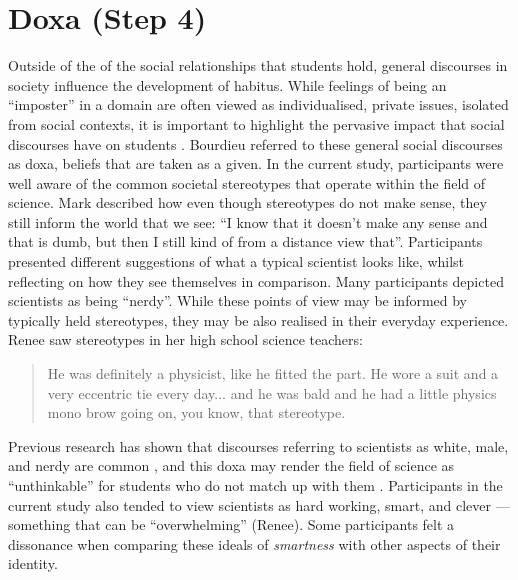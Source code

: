 \section{Doxa (Step 4)}
Outside of the of the social relationships that students hold, general discourses in society influence the development of habitus. 
While feelings of being an ``imposter'' in a domain are often viewed as individualised, private issues, isolated from social contexts, it is important to highlight the pervasive impact that social discourses have on students  \citep{breeze2018imposter}. Bourdieu referred to these general social discourses as doxa, beliefs that are taken as a given. In the current study, participants were well aware of the common societal stereotypes that operate within the field of science. Mark described how even though stereotypes do not make sense, they still inform the world that we see: ``I know that it doesn't make any sense and that is dumb, but then I still kind of from a distance view that''. Participants presented different suggestions of what a typical scientist looks like, whilst reflecting on how they see themselves in comparison. Many participants depicted scientists as being ``nerdy''. While these points of view may be informed by typically held stereotypes, they may be also realised in their everyday experience. Renee saw stereotypes in her high school science teachers: \blockquote{He was definitely a physicist, like he fitted the part. He wore a suit and a very eccentric tie every day... and he was bald and he had a little physics mono brow going on, you know, that stereotype.} Previous research has shown that discourses referring to scientists as white, male, and nerdy are common \cite{Nosek_2009}, and this doxa may render the field of science as ``unthinkable'' for students who do not match up with them \cite{Archer_2013}. Participants in the current study also tended to view scientists as hard working, smart, and clever --- something that can be ``overwhelming'' (Renee). Some participants felt a dissonance when comparing these ideals of \textit{smartness} with other aspects of their identity.

